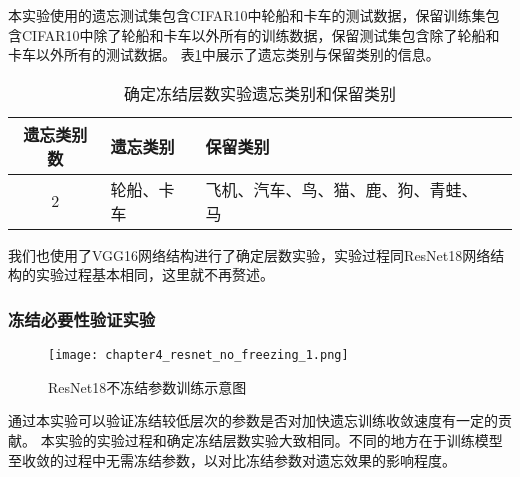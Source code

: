 本实验使用的遗忘测试集包含CIFAR10中轮船和卡车的测试数据，保留训练集包含CIFAR10中除了轮船和卡车以外所有的训练数据，保留测试集包含除了轮船和卡车以外所有的测试数据。
表\ref{tab:forget-continuous-2-kinds}中展示了遗忘类别与保留类别的信息。
\begin{table}
    \centering
    \caption{确定冻结层数实验遗忘类别和保留类别}
    \begin{tabular}{cp{3cm}p{7cm}p{7cm}}
      \toprule 
      遗忘类别数  & 遗忘类别 & 保留类别  \\
      \midrule
      2 & 轮船、卡车  & 飞机、汽车、鸟、猫、鹿、狗、青蛙、马  \\
      \bottomrule
    \end{tabular}
    \label{tab:forget-continuous-2-kinds}
\end{table}
我们也使用了VGG16网络结构进行了确定层数实验，实验过程同ResNet18网络结构的实验过程基本相同，这里就不再赘述。

\subsubsection{冻结必要性验证实验}
\begin{figure}
    \centering
    \texttt{[image: chapter4\_resnet\_no\_freezing\_1.png]}
    \caption{ResNet18不冻结参数训练示意图}
    \label{fig:chapter4_resnet_no_freezing_1}
\end{figure}


通过本实验可以验证冻结较低层次的参数是否对加快遗忘训练收敛速度有一定的贡献。
本实验的实验过程和确定冻结层数实验大致相同。不同的地方在于训练模型至收敛的过程中无需冻结参数，以对比冻结参数对遗忘效果的影响程度。

